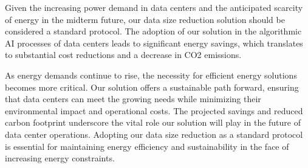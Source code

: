 Given the increasing power demand in data centers and the anticipated scarcity of energy in the midterm future, our data size reduction solution should be considered a standard protocol. The adoption of our solution in the algorithmic AI processes of data centers leads to significant energy savings, which translates to substantial cost reductions and a decrease in CO2 emissions. 

As energy demands continue to rise, the necessity for efficient energy solutions becomes more critical. Our solution offers a sustainable path forward, ensuring that data centers can meet the growing needs while minimizing their environmental impact and operational costs. The projected savings and reduced carbon footprint underscore the vital role our solution will play in the future of data center operations. Adopting our data size reduction as a standard protocol is essential for maintaining energy efficiency and sustainability in the face of increasing energy constraints.
